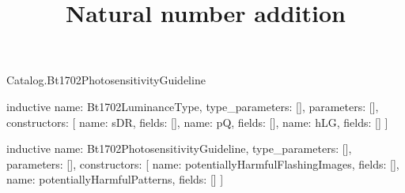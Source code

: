 \begin{lexlean}{Catalog.Bt1702PhotosensitivityGuideline}
\title{Natural number addition}
\begin{semanticmodule}
inductive{
  name: Bt1702LuminanceType,
  type_parameters: [],
  parameters: [],
  constructors: [
    {name: sDR, fields: []},
    {name: pQ, fields: []},
    {name: hLG, fields: []}
  ]
}

inductive{
  name: Bt1702PhotosensitivityGuideline,
  type_parameters: [],
  parameters: [],
  constructors: [
    {name: potentiallyHarmfulFlashingImages, fields: []},
    {name: potentiallyHarmfulPatterns, fields: []}
  ]
}
\end{semanticmodule}
\end{lexlean}
